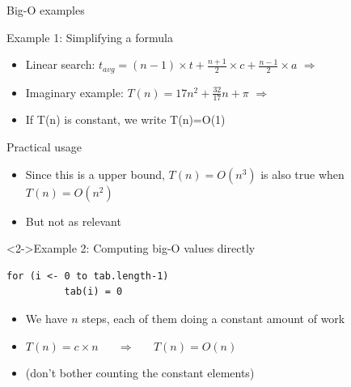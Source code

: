 \begin{frame}[fragile]{Big-O examples}
  \begin{block}{Example 1: Simplifying a formula}
    \begin{itemize}
    \item Linear search: $t_{avg}=(n-1)\times t+\frac{n+1}{2}\times
      c+\frac{n-1}{2}\times a$ $\Rightarrow$ 
    \item Imaginary example: $T(n)=17n^2+\frac{32}{17}n+\pi$
      $\Rightarrow$ 
    \item If T(n) is constant, we write T(n)=O(1)
    \end{itemize}
  \end{block}

  \begin{block}{Practical usage}
    \begin{itemize}
    \item Since this is a upper bound, $T(n)=O(n^3)$ is also true when $T(n)=O(n^2)$
    \item But not as relevant
    \end{itemize}
  \end{block}

  \begin{block}<2->{Example 2: Computing big-O values directly}\medskip
    \begin{center}
      \begin{minipage}{.5\linewidth}        
      \begin{Verbatim}[label=array initialization,gobble=8,frame=single]
        for (i <- 0 to tab.length-1) 
          tab(i) = 0
      \end{Verbatim}
      \end{minipage}
    \end{center}
    \vspace{-\baselineskip}
    \begin{itemize}
    \item We have $n$ steps, each of them doing a constant amount of work
    \item $T(n) = c\times n$ ~~ $\Rightarrow$ ~~ $T(n) = O(n)$
    \item[] (don't bother counting the constant elements)
    \end{itemize}
  \end{block}
\end{frame}
